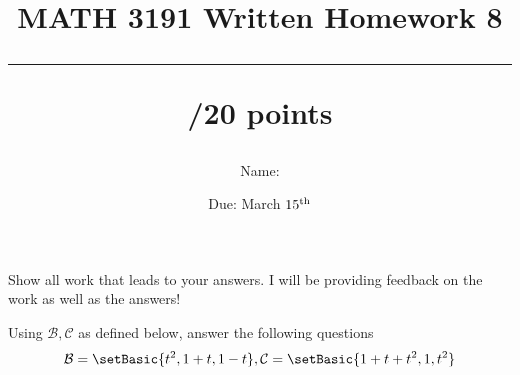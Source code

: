 \documentclass{exam}
\title{MATH 3191 Written Homework 8\\\rule{30pt}{1pt}/20 points}
\author{Name: \rule{150pt}{1pt}}
\date{Due: March $15^\textnormal{th}$}
\renewcommand{\B}{\mathcal{B}}
\renewcommand{\C}{\mathcal{C}}
\begin{document}
\maketitle
Show all work that leads to your answers. I will be providing feedback on the work as well as the answers!
\begin{questions}
    \question Using $\B,\C$ as defined below, answer the following questions
    \[
        \B = \setBasic{t^2, 1+t, 1-t}, \C = \setBasic{1+t+t^2, 1, t^2}
    \]
\end{questions}
\end{document}
